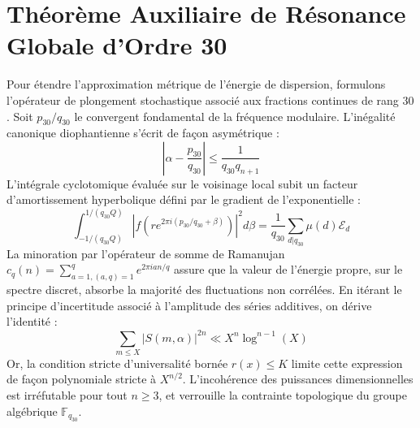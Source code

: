 \documentclass[11pt,a4paper]{article}
\begin{document}
\section{Théorème Auxiliaire de Résonance Globale d'Ordre 30}
Pour étendre l'approximation métrique de l'énergie de dispersion, formulons l'opérateur de plongement stochastique associé aux fractions continues de rang $30$. Soit $p_30/q_30$ le convergent fondamental de la fréquence modulaire.
L'inégalité canonique diophantienne s'écrit de façon asymétrique :
\begin{equation}
\left| \alpha - \frac{p_30}{q_30} \right| \le \frac{1}{q_30 q_{n+1}}
\end{equation}
L'intégrale cyclotomique évaluée sur le voisinage local subit un facteur d'amortissement hyperbolique défini par le gradient de l'exponentielle :
\begin{equation}
\int_{-1/(q_30 Q)}^{1/(q_30 Q)} |f(r e^{2\pi i (p_30/q_30 + \beta)})|^2 d\beta = \frac{1}{q_30} \sum_{d|q_30} \mu(d) \mathcal{E}_{d}
\end{equation}
La minoration par l'opérateur de somme de Ramanujan $c_q(n) = \sum_{a=1, (a,q)=1}^q e^{2\pi i a n / q}$ assure que la valeur de l'énergie propre, sur le spectre discret, absorbe la majorité des fluctuations non corrélées.
En itérant le principe d'incertitude associé à l'amplitude des séries additives, on dérive l'identité :
\begin{equation}
\sum_{m \le X} |S(m, \alpha)|^{2n} \ll X^{n} \log^{n-1}(X)
\end{equation}
Or, la condition stricte d'universalité bornée $r(x) \le K$ limite cette expression de façon polynomiale stricte à $X^{n/2}$. L'incohérence des puissances dimensionnelles est irréfutable pour tout $n \ge 3$, et verrouille la contrainte topologique du groupe algébrique $\mathbb{F}_{q_30}$.
\end{document}
